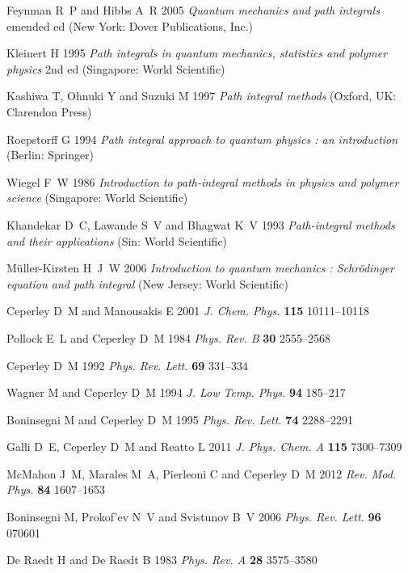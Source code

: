 \documentclass[12pt]{iopart}
\begin{document}
\begin{thebibliography}{100}
Feynman R~P and Hibbs A~R 2005 {\em Quantum mechanics and path integrals\/}
  emended ed (New York: Dover Publications, Inc.)

Kleinert H 1995 {\em Path integrals in quantum mechanics, statistics and
  polymer physics\/} 2nd ed (Singapore: World Scientific)

Kashiwa T, Ohnuki Y and Suzuki M 1997 {\em Path integral methods\/} (Oxford,
  UK: Clarendon Press)

Roepstorff G 1994 {\em Path integral approach to quantum physics : an
  introduction\/} (Berlin: Springer)

Wiegel F~W 1986 {\em Introduction to path-integral methods in physics and
  polymer science\/} (Singapore: World Scientific)

Khandekar D~C, Lawande S~V and Bhagwat K~V 1993 {\em Path-integral methods and
  their applications\/} (Sin: World Scientific)

M{\"u}ller-Kirsten H~J~W 2006 {\em Introduction to quantum mechanics :
  Schr{\"o}dinger equation and path integral\/} (New Jersey: World Scientific)

Ceperley D~M and Manousakis E 2001 {\em J. Chem. Phys.\/} {\bf 115}
  10111--10118

Pollock E~L and Ceperley D~M 1984 {\em Phys. Rev. B\/} {\bf 30} 2555--2568

Ceperley D~M 1992 {\em Phys. Rev. Lett.\/} {\bf 69} 331--334

Wagner M and Ceperley D~M 1994 {\em J. Low Temp. Phys.\/} {\bf 94} 185--217

Boninsegni M and Ceperley D~M 1995 {\em Phys. Rev. Lett.\/} {\bf 74} 2288--2291

Galli D~E, Ceperley D~M and Reatto L 2011 {\em J. Phys. Chem. A\/} {\bf 115}
  7300--7309

McMahon J~M, Marales M~A, Pierleoni C and Ceperley D~M 2012 {\em Rev. Mod.
  Phys.\/} {\bf 84} 1607--1653

Boninsegni M, Prokof'ev N~V and Svistunov B~V 2006 {\em Phys. Rev. Lett.\/}
  {\bf 96} 070601

{De Raedt} H and {De Raedt} B 1983 {\em Phys. Rev. A\/} {\bf 28} 3575--3580


\end{thebibliography}
\end{document}
